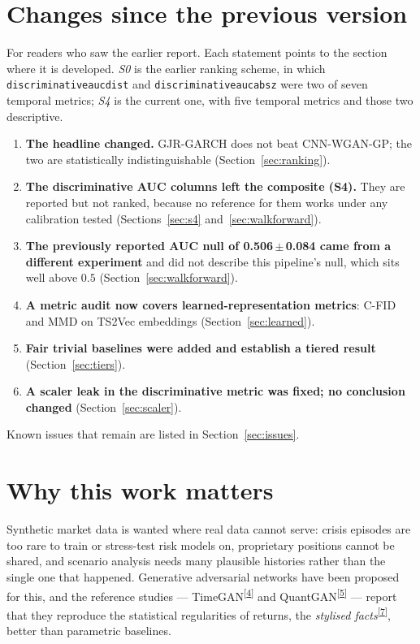 \documentclass[11pt,a4paper]{article}
\makeatletter
\newcommand{\tcite}[1]{\textsuperscript{[\hyperlink{R:#1}{#1}]}}
\DeclareRobustCommand{\_}{\ifmmode\nfss@text{\textunderscore}\else\textunderscore\allowbreak\fi}
\makeatother
\begin{document}
\section{Changes since the previous version}
\label{sec:changes}
For readers who saw the earlier report. Each statement points to the section where it is developed. \emph{S0} is the earlier ranking scheme, in which \texttt{discriminative\_auc\_dist} and \texttt{discriminative\_auc\_absz} were two of seven temporal metrics; \emph{S4} is the current one, with five temporal metrics and those two descriptive.
\begin{enumerate}[leftmargin=1.6em,itemsep=4pt]
\item \textbf{The headline changed.} GJR-GARCH does not beat CNN-WGAN-GP; the two are statistically indistinguishable (Section~\ref{sec:ranking}).
\item \textbf{The discriminative AUC columns left the composite (S4).} They are reported but not ranked, because no reference for them works under any calibration tested (Sections~\ref{sec:s4} and~\ref{sec:walkforward}).
\item \textbf{The previously reported AUC null of 0.506\,$\pm$\,0.084 came from a different experiment} and did not describe this pipeline's null, which sits well above $0.5$ (Section~\ref{sec:walkforward}).
\item \textbf{A metric audit now covers learned-representation metrics}: C-FID and MMD on TS2Vec embeddings (Section~\ref{sec:learned}).
\item \textbf{Fair trivial baselines were added and establish a tiered result} (Section~\ref{sec:tiers}).
\item \textbf{A scaler leak in the discriminative metric was fixed; no conclusion changed} (Section~\ref{sec:scaler}).
\end{enumerate}
Known issues that remain are listed in Section~\ref{sec:issues}.

\section{Why this work matters}
\label{sec:why}
Synthetic market data is wanted where real data cannot serve: crisis episodes are too rare to train or stress-test risk models on, proprietary positions cannot be shared, and scenario analysis needs many plausible histories rather than the single one that happened. Generative adversarial networks have been proposed for this, and the reference studies --- TimeGAN\tcite{4} and QuantGAN\tcite{5} --- report that they reproduce the statistical regularities of returns, the \emph{stylised facts}\tcite{7}, better than parametric baselines.
\end{document}
